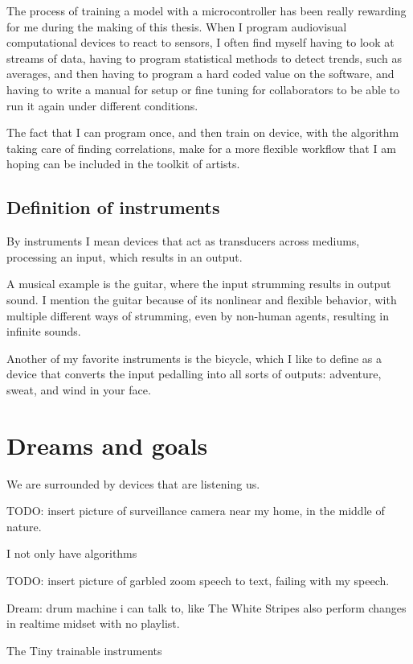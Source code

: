 The process of training a model with a microcontroller has been really rewarding for me during the making of this thesis. When I program audiovisual computational devices to react to sensors, I often find myself having to look at streams of data, having to program statistical methods to detect trends, such as averages, and then having to program a hard coded value on the software, and having to write a manual for setup or fine tuning for collaborators to be able to run it again under different conditions.

The fact that I can program once, and then train on device, with the algorithm taking care of finding correlations, make for a more flexible workflow that I am hoping can be included in the toolkit of artists.

\subsection{Definition of instruments}

By instruments I mean devices that act as transducers across mediums, processing an input, which results in an output.

 A musical example is the guitar, where the input strumming results in output sound. I mention the guitar because of its nonlinear and flexible behavior, with multiple different ways of strumming, even by non-human agents, resulting in infinite sounds.

Another of my favorite instruments is the bicycle, which I like to define as a device that converts the input pedalling into all sorts of outputs: adventure, sweat, and wind in your face.

\section{Dreams and goals}

We are surrounded by devices that are listening us.

TODO: insert picture of surveillance camera near my home, in the middle of nature.

I not only have algorithms

TODO: insert picture of garbled zoom speech to text, failing with my speech.

Dream: drum machine i can talk to, like The White Stripes also perform changes in realtime midset with no playlist.  



The Tiny trainable instruments 

